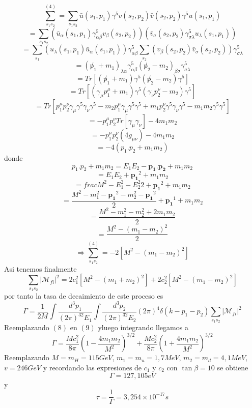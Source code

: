 \[
 \sum_{s_1s_2}^{(4)}=\sum_{s_1s_2}\bar{u}(s_1,p_1)\gamma^{5}v(s_2,p_2)\bar{v}(s_2,p_2) \gamma^{5}u(s_1,p_1)
\]
\[
 =\sum_{s_1s_2}(\bar{u}_{\alpha}(s_1,p_1)\gamma^{5}_{\alpha\beta}v_{\beta}(s_2,p_2))(\bar{v}_{\sigma}(s_2,p_2) \gamma^{5}_{\sigma\lambda}u_{\lambda}(s_1,p_1))
\]
\[
 =\sum_{s_1}(u_{\lambda}(s_1,p_1)\bar{u}_{\alpha}(s_1,p_1))\gamma^{5}_{\alpha\beta}\sum_{s_2}(v_{\beta}(s_2,p_2)\bar{v}_{\sigma}(s_2,p_2)) \gamma^{5}_{\sigma\lambda}
\]
\[
 =(\not p_1+m_1)_{\lambda\alpha}\gamma^{5}_{\alpha \beta}(\not p_2-m_2)_{\beta\sigma}\gamma^{5}_{\sigma\lambda}
\]
\[
 =Tr[(\not p_1+m_1)\gamma^{5}(\not p_2-m_2)\gamma^{5}]
\]
\[
 =Tr[(\gamma_{\mu}p^{\mu}_1+m_1)\gamma^{5}(\gamma_{\nu}p^{\nu}_2-m_2)\gamma^{5}]
\]
\[
 =Tr[p^{\mu}_1p^{\nu}_2\gamma_{\mu}\gamma^{5}\gamma_{\nu}\gamma^{5}-m_2p^{\mu}_1\gamma_{\mu}\gamma^{5}\gamma^{5}
+m_1p^{\nu}_2\gamma^{5}\gamma_{\nu}\gamma^{5}-m_1m_2\gamma^{5}\gamma^{5}]
\]
\[
 =-p^{\mu}_1p^{\nu}_2Tr[\gamma_{\mu}\gamma_{\nu}]-4m_1m_2
\]
\[
 =-p^{\mu}_1p^{\nu}_2(4g_{\mu\nu})-4m_1m_2
\]
\[
 =-4(p_1.p_2+m_1m_2)
\]
donde
\[
 p_1.p_2+m_1m_2=E_1E_2-\mathbf{p_1}.\mathbf{p_2}+m_1m_2
\]
\[
 =E_1E_2+\mathbf{p_1}^{2}+m_1m_2
\]
\[
 =frac{M^{2}-E^{2}_1-E^{2}_2}{2}+\mathbf{p_1}^{2}+m_1m_2
\]
\[
 =\frac{M^{2}-m^{2}_1-\mathbf{p_1}^{2}-m^{2}_2-\mathbf{p_1}^{2}}{2}+\mathbf{p_1}^{1}+m_1m_2
\]
\[
 =\frac{M^{2}-m^{2}_1-m^{2}_2+2m_1m_2}{2}
\]
\[
 =\frac{M^{2}-(m_1-m_2)^{2}}{2}
\]
\[
 \Rightarrow \sum_{s_1s_2}^{(4)}=-2[M^{2}-(m_1-m_2)^{2}]
\]
Asi tenemos finalmente 
\begin{equation}
 \sum_{s_1s_2}|\mathcal{M}_{fi}|^{2}=2c_1^{2}[M^{2}-(m_1+m_2)^{2}]+2c_2^{2}[M^{2}-(m_1-m_2)^{2}]
\end{equation}
por tanto la tasa de decaimiento de este proceso es 
\begin{equation}
 \Gamma=\frac{1}{2M}\int\frac{d^3p_1}{(2\pi)^32E_1}\int\frac{d^3p_2}{(2\pi)^32E_2}(2\pi)^4\delta(k-p_1-p_2)\sum_{s_1s_2}|\mathcal{M}_{fi}|^2
\end{equation}
Reemplazando $(8)$ en $(9)$ yluego integrando llegamos a 
\begin{equation}
 \Gamma=\frac{Mc_1^{2}}{8\pi}\left(1-\frac{4m_1m_2}{M^2}\right)^{3/2}+\frac{Mc_2^{2}}{8\pi}\left(1+\frac{4m_1m_2}{M^2}\right)^{3/2}
\end{equation}
Reemplazando $M=m_H=115 GeV$, $m_1=m_u=1,7 MeV$, $m_2=m_d=4,1 MeV$,$v=246 GeV$ y recordando las expresiones de $c_1$ y $c_2$ con $\tan\beta=10$ se obtiene
\begin{equation}
 \Gamma=127,105 eV
\end{equation}
 y 
\begin{equation}
 \tau=\frac{1}{\Gamma}=3,254\times 10^{-17} s
\end{equation}

